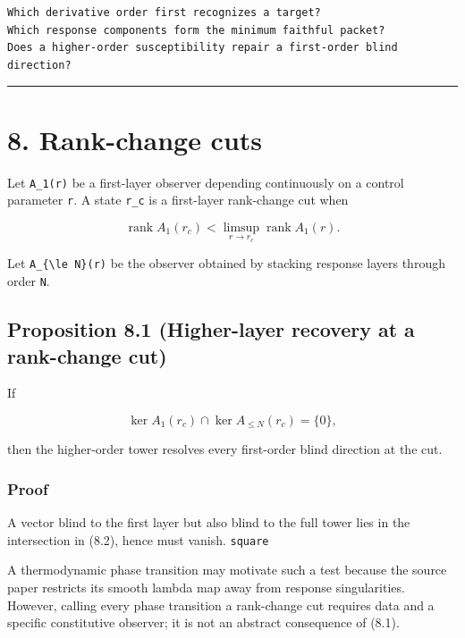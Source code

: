 \begin{verbatim}
Which derivative order first recognizes a target?
Which response components form the minimum faithful packet?
Does a higher-order susceptibility repair a first-order blind direction?
\end{verbatim}

\begin{center}\rule{0.5\linewidth}{0.5pt}\end{center}

\hypertarget{rank-change-cuts}{%
\section{8. Rank-change cuts}\label{rank-change-cuts}}

Let \texttt{A\_1(r)} be a first-layer observer depending continuously on a control
parameter \texttt{r}. A state \texttt{r\_c} is a first-layer rank-change cut when

\[
\operatorname{rank}A_1(r_c)
<
\limsup_{r\to r_c}\operatorname{rank}A_1(r).
\tag{8.1}
\]

Let \texttt{A\_\{\textbackslash{}le\ N\}(r)} be the observer obtained by stacking response layers through
order \texttt{N}.

\hypertarget{proposition-8.1-higher-layer-recovery-at-a-rank-change-cut}{%
\subsection{Proposition 8.1 (Higher-layer recovery at a rank-change cut)}\label{proposition-8.1-higher-layer-recovery-at-a-rank-change-cut}}

If

\[
\ker A_1(r_c)\cap\ker A_{\le N}(r_c)=\{0\},
\tag{8.2}
\]

then the higher-order tower resolves every first-order blind direction at the
cut.

\hypertarget{proof-5}{%
\subsubsection{Proof}\label{proof-5}}

A vector blind to the first layer but also blind to the full tower lies in the
intersection in (8.2), hence must vanish. \texttt{square}

A thermodynamic phase transition may motivate such a test because the source
paper restricts its smooth lambda map away from response singularities.
However, calling every phase transition a rank-change cut requires data and a
specific constitutive observer; it is not an abstract consequence of (8.1).

